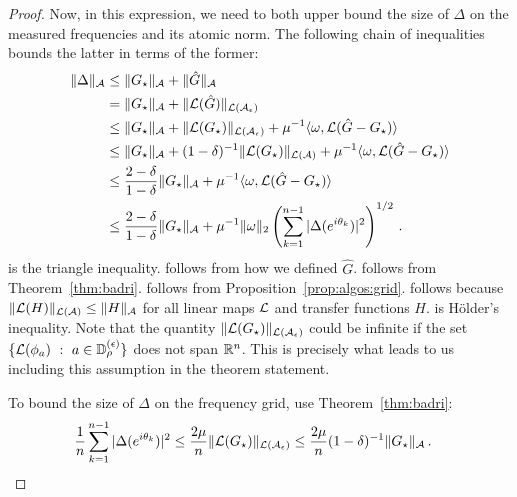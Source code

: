 \begin{proof}
Now, in this expression, we need to both upper bound the size of $\Delta$ on the
measured frequencies and its atomic norm. The following chain of inequalities bounds the latter in terms of the former:
\begin{align}
\label{eq:tri-ineq3}	\|\Delta\|_{\mathcal{A}} &\leq \| G_\star\|_{\mathcal{A}}+\|\hat{G}\|_{\mathcal{A}}\\
\label{eq:Ghat-def}	& = \|G_\star\|_{\mathcal{A}} + \|\mathcal{L}(\hat{G})\|_{\mathcal{L}(\mathcal{A}_\epsilon)}\\
\label{eq:apply-dast-cond}	& \leq \|G_\star\|_{\mathcal{A}} + \|\mathcal{L}(G_\star)\|_{\mathcal{L}(\mathcal{A}_\epsilon)} + \mu^{-1} \langle \omega, \mathcal{L}(\hat{G}-G_{\star})\rangle \\
\label{eq:apply-grid-prop}	& \leq \|G_\star\|_{\mathcal{A}} + (1-\delta)^{-1}\| \mathcal{L}(G_\star)\|_{\mathcal{L}(\mathcal{A})} + \mu^{-1} \langle \omega, \mathcal{L}(\hat{G}-G_{\star})\rangle \\
\label{eq:inf-domination}		& \leq \frac{2-\delta}{1-\delta} \|G_\star\|_{\mathcal{A}}  + \mu^{-1} \langle \omega, \mathcal{L}(\hat{G}-G_{\star})\rangle \\
\label{eq:holder-mf}		& \leq \frac{2-\delta}{1-\delta} \|G_\star\|_{\mathcal{A}}  + \mu^{-1} \| \omega\|_2 \left(\sum_{k=1}^{n-1} |\Delta(e^{i\theta_k})|^2\right)^{1/2} \,.
\end{align}
 is the triangle inequality.  follows from how we defined $\hat{G}$.   follows from Theorem~\ref{thm:badri}.   follows from Proposition~\ref{prop:algos:grid}.   follows because $\|\mathcal{L}(H)\|_{\mathcal{L}(\mathcal{A})} \leq \|H\|_{\mathcal{A}}$ for all linear maps $\mathcal{L}$ and transfer functions $H$.   is H\"{o}lder's inequality.  Note that the quantity $\|\mathcal{L}(G_\star)\|_{\mathcal{L}(\mathcal{A}_\epsilon)}$ could be infinite if the set $\{\mathcal{L}(\phi_a)~:~a\in \mathbb{D}_{\rho}^{(\epsilon)}\}$ does not span $\mathbb{R}^n$.  This is precisely what leads to us including this assumption in the theorem statement.

To bound the size of $\Delta$ on the frequency grid, use Theorem~\ref{thm:badri}:
\begin{align*}
	\frac{1}{n}\sum_{k=1}^{n-1} |\Delta(e^{i\theta_k})|^2  &\leq \frac{2\mu}{n} \|\mathcal{L}(G_\star)\|_{\mathcal{L}(\mathcal{A}_\epsilon)}
	\leq \frac{2\mu}{n} (1-\delta)^{-1}\|G_\star\|_{\mathcal{A}}	\,.
\end{align*}



\end{proof}
